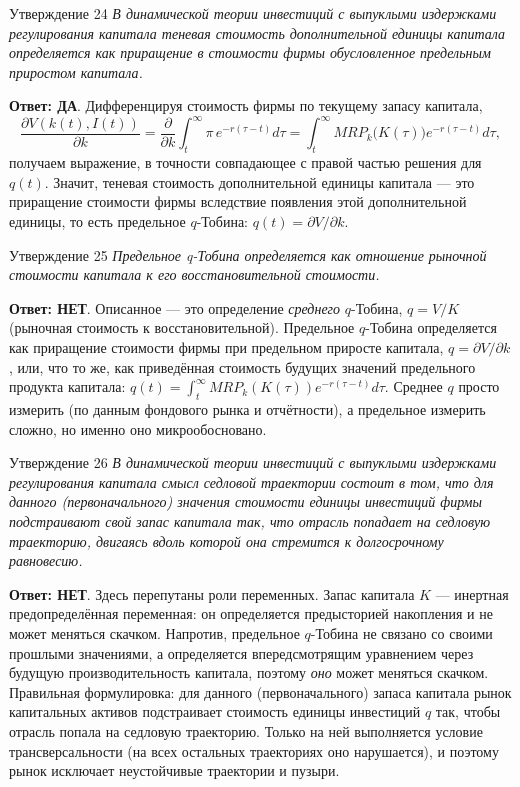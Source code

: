 \documentclass[10pt,a4paper]{article}
\newcommand{\qda}{\textbf{\color{yesgreen}Ответ: ДА}}
\newcommand{\qnet}{\textbf{\color{nored}Ответ: НЕТ}}
\newenvironment{answer}[2]{%
  \begin{qbox}{Утверждение #1}
  \textit{#2}\par\smallskip
}{%
  \end{qbox}\vspace{2pt}
}
\begin{document}
\begin{answer}{24}{В динамической теории инвестиций с выпуклыми издержками регулирования капитала теневая стоимость дополнительной единицы капитала определяется как приращение в стоимости фирмы обусловленное предельным приростом капитала.}
\qda. Дифференцируя стоимость фирмы по текущему запасу капитала,
\[
\dfrac{\partial V(k(t),I(t))}{\partial k}=\dfrac{\partial}{\partial k}\int_t^\infty\pi\,e^{-r(\tau-t)}d\tau=\int_t^\infty MRP_k\bigl(K(\tau)\bigr)e^{-r(\tau-t)}d\tau,
\]
получаем выражение, в точности совпадающее с правой частью решения для $q(t)$. Значит, теневая стоимость дополнительной единицы капитала --- это приращение стоимости фирмы вследствие появления этой дополнительной единицы, то есть предельное $q$-Тобина: $q(t)=\partial V/\partial k$.
\end{answer}

\begin{answer}{25}{Предельное q-Тобина определяется как отношение рыночной стоимости капитала к его восстановительной стоимости.}
\qnet. Описанное --- это определение \emph{среднего} $q$-Тобина, $q=V/K$ (рыночная стоимость к восстановительной). Предельное $q$-Тобина определяется как приращение стоимости фирмы при предельном приросте капитала, $q=\partial V/\partial k$, или, что то же, как приведённая стоимость будущих значений предельного продукта капитала: $q(t)=\int_t^\infty MRP_k(K(\tau))e^{-r(\tau-t)}d\tau$. Среднее $q$ просто измерить (по данным фондового рынка и отчётности), а предельное измерить сложно, но именно оно микрообосновано.
\end{answer}

\begin{answer}{26}{В динамической теории инвестиций с выпуклыми издержками регулирования капитала смысл седловой траектории состоит в том, что для данного (первоначального) значения стоимости единицы инвестиций фирмы подстраивают свой запас капитала так, что отрасль попадает на седловую траекторию, двигаясь вдоль которой она стремится к долгосрочному равновесию.}
\qnet. Здесь перепутаны роли переменных. Запас капитала $K$ --- инертная предопределённая переменная: он определяется предысторией накопления и не может меняться скачком. Напротив, предельное $q$-Тобина не связано со своими прошлыми значениями, а определяется впередсмотрящим уравнением через будущую производительность капитала, поэтому \emph{оно} может меняться скачком. Правильная формулировка: для данного (первоначального) запаса капитала рынок капитальных активов подстраивает стоимость единицы инвестиций $q$ так, чтобы отрасль попала на седловую траекторию. Только на ней выполняется условие трансверсальности (на всех остальных траекториях оно нарушается), и поэтому рынок исключает неустойчивые траектории и пузыри.
\end{answer}
\end{document}
